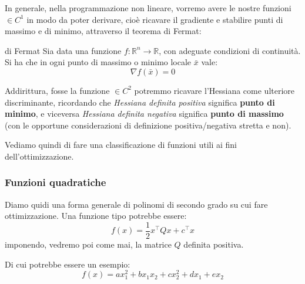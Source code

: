 \documentclass[a4paper,11pt]{article}
\begin{document}
\par\smallskip

In generale, nella programmazione non lineare, vorremo avere le nostre funzioni $\in C^1$ in modo da poter derivare, cioè ricavare il gradiente e stabilire punti di massimo e di minimo, attraverso il teorema di Fermat:
\begin{theorem}{di Fermat}
	Sia data una funzione $f: \mathbb{R}^n \rightarrow \mathbb{R}$, con adeguate condizioni di continuità.
	Si ha che in ogni punto di massimo o minimo locale $\bar{x}$ vale:
	$$
		\nabla f (\bar{x}) = 0
	$$
\end{theorem}

Addirittura, fosse la funzione $\in C^2$ potremmo ricavare l'Hessiana come ulteriore discriminante, ricordando che \textit{Hessiana definita positiva} significa \textbf{punto di minimo}, e viceversa \textit{Hessiana definita negativa} significa \textbf{punto di massimo} (con le opportune considerazioni di definizione positiva/negativa stretta e non).

Vediamo quindi di fare una classificazione di funzioni utili ai fini dell'ottimizzazione.

\subsubsection{Funzioni quadratiche}
Diamo quidi una forma generale di polinomi di secondo grado su cui fare ottimizzazione.
Una funzione tipo potrebbe essere:
$$
f(x) = \frac{1}{2}x^\intercal Qx + c^\intercal x
$$
imponendo, vedremo poi come mai, la matrice $Q$ definita positiva.

Di cui potrebbe essere un esempio:
$$
f(x) = ax_1^2 + bx_1x_2 + cx_2^2 + dx_1 + ex_2
$$
\end{document}
